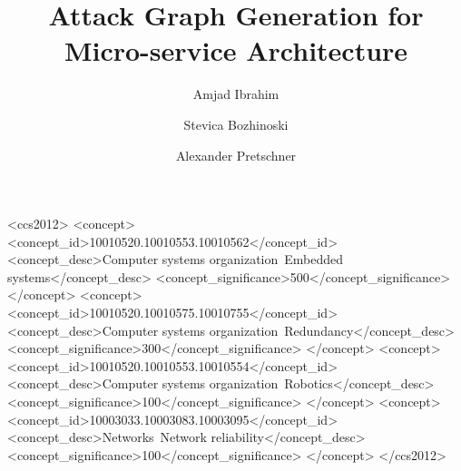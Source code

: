 \documentclass[sigconf]{acmart}
\begin{document}
\title{Attack Graph Generation for Micro-service
	Architecture}


\author{Amjad Ibrahim}

\author{Stevica Bozhinoski}

\author{Alexander Pretschner}

\renewcommand{\shortauthors}{B. Trovato et al.}


\begin{abstract}
	


\end{abstract}

%
%
\begin{CCSXML}
<ccs2012>
 <concept>
  <concept_id>10010520.10010553.10010562</concept_id>
  <concept_desc>Computer systems organization~Embedded systems</concept_desc>
  <concept_significance>500</concept_significance>
 </concept>
 <concept>
  <concept_id>10010520.10010575.10010755</concept_id>
  <concept_desc>Computer systems organization~Redundancy</concept_desc>
  <concept_significance>300</concept_significance>
 </concept>
 <concept>
  <concept_id>10010520.10010553.10010554</concept_id>
  <concept_desc>Computer systems organization~Robotics</concept_desc>
  <concept_significance>100</concept_significance>
 </concept>
 <concept>
  <concept_id>10003033.10003083.10003095</concept_id>
  <concept_desc>Networks~Network reliability</concept_desc>
  <concept_significance>100</concept_significance>
 </concept>
</ccs2012>  
\end{CCSXML}





\maketitle







 
\end{document}
